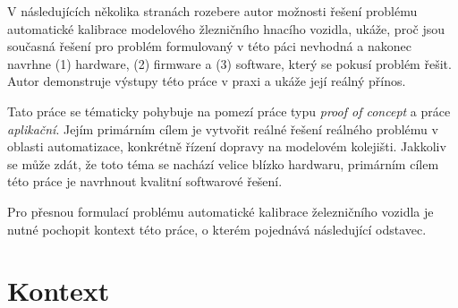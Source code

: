 V následujících několika stranách rozebere autor možnosti řešení problému
automatické kalibrace modelového žlezničního hnacího vozidla, ukáže, proč
jsou současná řešení pro problém formulovaný v této páci nevhodná a nakonec
navrhne (1) hardware, (2) firmware a (3) software, který se pokusí problém
řešit. Autor demonstruje výstupy této práce v praxi a ukáže její reálný
přínos.

Tato práce se tématicky pohybuje na pomezí práce typu \textit{proof of concept}
a práce \textit{aplikační}. Jejím primárním cílem je vytvořit reálné řešení
reálného problému v oblasti automatizace, konkrétně řízení dopravy na modelovém
kolejišti. Jakkoliv se může zdát, že toto téma se nachází velice blízko
hardwaru, primárním cílem této práce je navrhnout kvalitní softwarové řešení.

Pro přesnou formulací problému automatické kalibrace železničního vozidla je
nutné pochopit kontext této práce, o kterém pojednává následující odstavec.

\section{Kontext}

